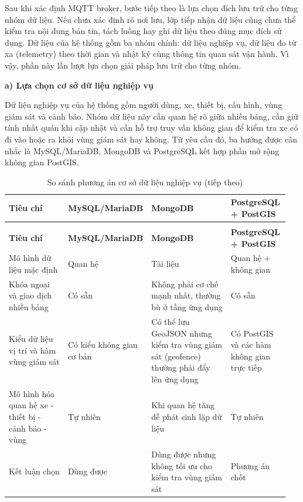 \documentclass[a4paper]{extarticle}
\newcommand{\thesissettableid}[2]{%
  \renewcommand{\thetable}{#1}%
  \renewcommand{\theHtable}{#2}%
}
\begin{document}
Sau khi xác định MQTT broker, bước tiếp theo là lựa chọn đích lưu trữ cho từng
nhóm dữ liệu. Nếu chưa xác định rõ nơi lưu, lớp tiếp nhận dữ liệu cũng chưa thể
kiểm tra nội dung bản tin, tách luồng hay ghi dữ liệu theo đúng mục đích sử
dụng. Dữ liệu của hệ thống gồm ba nhóm chính: dữ liệu nghiệp vụ, dữ liệu đo từ
xa (telemetry) theo thời gian và nhật ký cùng thông tin quan sát vận hành. Vì
vậy, phần này lần lượt lựa chọn giải pháp lưu trữ cho từng nhóm.

\textbf{a) Lựa chọn cơ sở dữ liệu nghiệp vụ}

Dữ liệu nghiệp vụ của hệ thống gồm người dùng, xe, thiết bị, cấu hình, vùng
giám sát và cảnh báo. Nhóm dữ liệu này cần quan hệ rõ giữa nhiều bảng, cần giữ
tính nhất quán khi cập nhật và cần hỗ trợ truy vấn không gian để kiểm tra xe có
đi vào hoặc ra khỏi vùng giám sát hay không. Từ yêu cầu đó, ba hướng được cân
nhắc là MySQL/MariaDB, MongoDB và PostgreSQL kết hợp phần mở rộng không gian
PostGIS.

{\thesissettableid{3.25}{condensed-bang-3-25-so-sanh-phuong-an-co-so-du-lieu-nghiep-vu}
\def\LTcaptype{table}
\begin{longtable}{|L{0.240\linewidth}|L{0.190\linewidth}|L{0.310\linewidth}|L{0.210\linewidth}|}
\caption{So sánh phương án cơ sở dữ liệu nghiệp vụ}\label{tab:condensed-bang-3-25-so-sanh-phuong-an-co-so-du-lieu-nghiep-vu}\\
\hline
\textbf{Tiêu chí} & \textbf{MySQL/}\newline\textbf{MariaDB} & \textbf{MongoDB} & \textbf{PostgreSQL + PostGIS} \\
\hline
\endfirsthead
\caption[]{So sánh phương án cơ sở dữ liệu nghiệp vụ (tiếp theo)}\\
\hline
\textbf{Tiêu chí} & \textbf{MySQL/}\newline\textbf{MariaDB} & \textbf{MongoDB} & \textbf{PostgreSQL + PostGIS} \\
\hline
\endhead
\endfoot
\endlastfoot
Mô hình dữ liệu mặc định & Quan hệ & Tài liệu & Quan hệ + không gian \\\hline
Khóa ngoại và giao dịch nhiều bảng & Có sẵn & Không phải cơ chế mạnh nhất, thường bù ở tầng ứng dụng & Có sẵn \\\hline
Kiểu dữ liệu vị trí và hàm vùng giám sát & Có kiểu không gian cơ bản & Có thể lưu GeoJSON nhưng kiểm tra vùng giám sát (geofence) thường phải đẩy lên ứng dụng & Có PostGIS và các hàm không gian trực tiếp \\\hline
Mô hình hóa quan hệ xe - thiết bị - cảnh báo - vùng & Tự nhiên & Khi quan hệ tăng dễ phát sinh lặp dữ liệu & Tự nhiên \\\hline
Kết luận chọn & Dùng được & Dùng được nhưng không tối ưu cho kiểm tra vùng giám sát & Phương án chốt \\\hline
\end{longtable}
}
\end{document}
